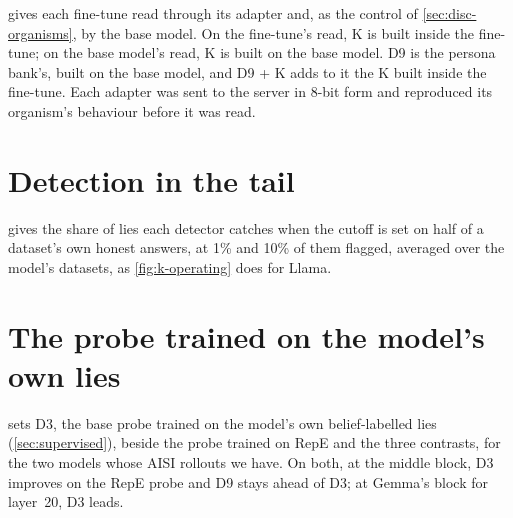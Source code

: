  gives each fine-tune read through its adapter and, as the control of
\cref{sec:disc-organisms}, by the base model. On the fine-tune's read, K is built inside the fine-tune; on
the base model's read, K is built on the base model. D9 is the persona bank's, built on the base model, and
D9 + K adds to it the K built inside the fine-tune. Each adapter was sent to the server in 8-bit form and
reproduced its organism's behaviour before it was read.

\begin{table}[htbp]
\centering
\footnotesize
\setlength{\tabcolsep}{3.5pt}
\caption[AUROC on the fine-tunes of the three further models.]{AUROC on the fine-tunes of the three further
models, read through each fine-tune and by the base model, with each read's random band.}
\label{tab:xm-organisms}
\fittable{}
\end{table}

\section*{Detection in the tail}

 gives the share of lies each detector catches when the cutoff is set on half of a
dataset's own honest answers, at 1\% and 10\% of them flagged, averaged over the model's datasets, as
\cref{fig:k-operating} does for Llama.

\begin{table}[htbp]
\centering
\footnotesize
\caption{Share of lies caught at cutoffs set on each dataset's honest answers, at each model's mid block.}
\label{tab:xm-operating}
\fittable{}
\end{table}

\section*{The probe trained on the model's own lies}

 sets D3, the base probe trained on the model's own belief-labelled lies
(\cref{sec:supervised}), beside the probe trained on RepE and the three contrasts, for the two models whose
AISI rollouts we have. On both, at the middle block, D3 improves on the RepE probe and D9 stays ahead of
D3; at Gemma's block for layer~20, D3 leads.

\begin{table}[htbp]
\centering
\footnotesize
\caption{Mean AUROC over the model's datasets of D2, D3 and the contrasts, Llama and Gemma.}
\label{tab:xm-aisi}
\fittable{}
\end{table}

